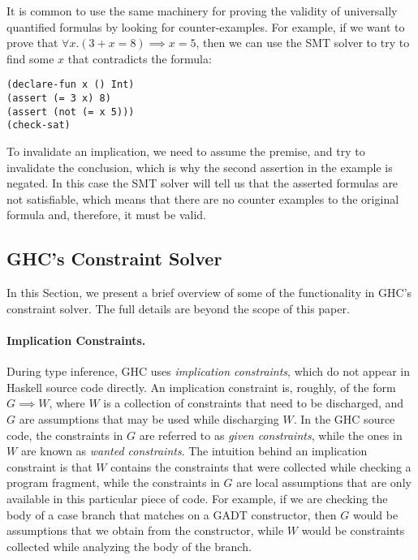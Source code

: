 \documentclass{sigplanconf}
\begin{document}
It is common to use the same machinery for proving the validity of
universally quantified formulas by looking for counter-examples.
For example, if we want to prove that $\forall x. (3 + x = 8) \implies x = 5$,
then we can use the SMT solver to try to find some $x$ that contradicts
the formula:

\begin{Verbatim}
(declare-fun x () Int)
(assert (= 3 x) 8)
(assert (not (= x 5)))
(check-sat)
\end{Verbatim}

To invalidate an implication, we need to assume the premise, and try to
invalidate the conclusion, which is why the second assertion in the
example is negated. In this case the SMT solver will tell us that the
asserted formulas are not satisfiable, which means that there are no
counter examples to the original formula and, therefore, it must be valid.


\subsection{GHC's Constraint Solver}

In this Section, we present a brief overview of some of the functionality
in GHC's constraint solver.  The full details \cite{outsidein} are beyond
the scope of this paper.

\paragraph{Implication Constraints.}
During type inference, GHC uses {\em implication constraints}, which do
not appear in Haskell source code directly. An implication constraint is,
roughly, of the form $G\implies W$, where $W$ is a collection
of constraints that need to be discharged, and $G$ are assumptions that
may be used while discharging $W$.  In the GHC source code, the constraints
in $G$ are referred to as {\em given constraints}, while the ones in $W$ are
known as {\em wanted constraints}.  The intuition behind an implication
constraint is that $W$ contains the constraints that were collected
while checking a program fragment, while the constraints in $G$ are local
assumptions that are only available in this particular piece of code.
For example, if we are checking the body of a case branch that matches
on a GADT constructor, then $G$ would be assumptions that we
obtain from the constructor, while $W$ would be constraints collected
while analyzing the body of the branch.
\end{document}
